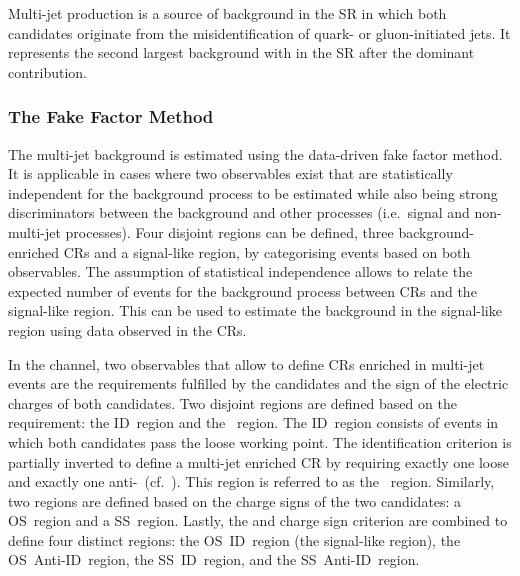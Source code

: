 Multi-jet production is a source of background in the \hadhad SR in which both
\tauhadvis candidates originate from the misidentification of quark- or
gluon-initiated jets. It represents the second largest background with
\faketauhadvis in the \hadhad SR after the dominant \ttbarFakes contribution.

\subsubsection{The Fake Factor Method}

The multi-jet background is estimated using the data-driven fake factor
method. It is applicable in cases where two observables exist that are
statistically independent for the background process to be estimated while also
being strong discriminators between the background and other processes (i.e.\
signal and non-multi-jet processes). Four disjoint regions can be defined, three
background-enriched CRs and a signal-like region, by categorising events based
on both observables. The assumption of statistical independence allows to relate
the expected number of events for the background process between CRs and the
signal-like region. This can be used to estimate the background in the
signal-like region using data observed in the CRs.

In the \hadhad channel, two observables that allow to define CRs enriched in
multi-jet events are the \tauid requirements fulfilled by the \tauhadvis
candidates and the sign of the electric charges of both candidates. Two disjoint
regions are defined based on the \tauid requirement: the ID~region and the
\antiid~region. The ID~region consists of events in which both \tauhadvis
candidates pass the loose \tauid working point. The identification criterion is
partially inverted to define a multi-jet enriched CR by requiring exactly one
loose \tauhadvis and exactly one
anti-\tauhadvis~(cf.~). This region is referred
to as the \antiid~region. Similarly, two regions are defined based on the charge
signs of the two \tauhadvis candidates: a OS~region and a SS~region. Lastly, the
\tauid and charge sign criterion are combined to define four distinct regions:
the OS~ID~region (the signal-like region), the OS~Anti-ID~region, the
SS~ID~region, and the SS~Anti-ID~region.

